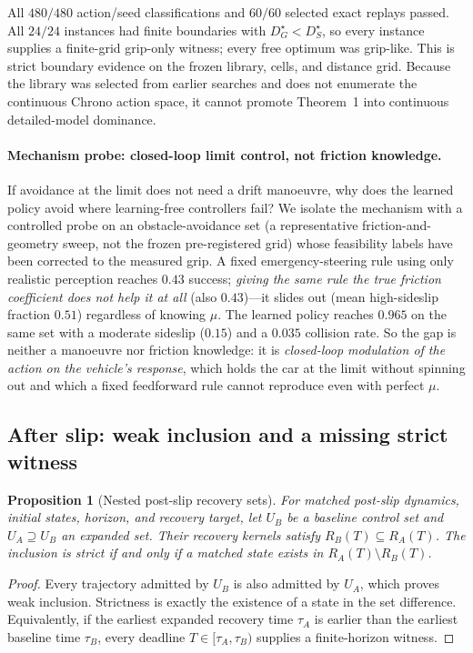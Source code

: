 \documentclass[11pt]{article}
\newtheorem{proposition}{Proposition}
\begin{document}
All $480/480$ action/seed classifications and $60/60$ selected exact replays passed. All $24/24$
instances had finite boundaries with $D_G^\star<D_S^\star$, so every instance supplies a finite-grid
grip-only witness; every free optimum was grip-like. This is strict boundary evidence on the frozen
library, cells, and distance grid. Because the library was selected from earlier searches and does
not enumerate the continuous Chrono action space, it cannot promote Theorem~1 into continuous
detailed-model dominance.

\paragraph{Mechanism probe: closed-loop limit control, not friction knowledge.}
If avoidance at the limit does not need a drift manoeuvre, why does the learned policy avoid where
learning-free controllers fail? We isolate the mechanism with a controlled probe on an
obstacle-avoidance set (a representative friction-and-geometry sweep, not the frozen pre-registered
grid) whose feasibility labels have been corrected to the measured grip. A fixed
emergency-steering rule using only realistic perception reaches $0.43$ success; \emph{giving the same
rule the true friction coefficient does not help it at all} (also $0.43$)---it slides out (mean
high-sideslip fraction $0.51$) regardless of knowing $\mu$. The learned policy reaches $0.965$ on the
same set with a moderate sideslip ($0.15$) and a $0.035$ collision rate. So the gap is neither a
manoeuvre nor friction knowledge: it is \emph{closed-loop modulation of the action on the vehicle's
response}, which holds the car at the limit without spinning out and which a fixed feedforward rule
cannot reproduce even with perfect $\mu$.

\subsection{After slip: weak inclusion and a missing strict witness}

\begin{proposition}[Nested post-slip recovery sets]
For matched post-slip dynamics, initial states, horizon, and recovery target, let $U_B$ be a baseline
control set and $U_A\supseteq U_B$ an expanded set. Their recovery kernels satisfy
$R_B(T)\subseteq R_A(T)$. The inclusion is strict if and only if a matched state exists in
$R_A(T)\setminus R_B(T)$.
\end{proposition}
\begin{proof}
Every trajectory admitted by $U_B$ is also admitted by $U_A$, which proves weak inclusion. Strictness
is exactly the existence of a state in the set difference. Equivalently, if the earliest expanded
recovery time $\tau_A$ is earlier than the earliest baseline time $\tau_B$, every deadline
$T\in[\tau_A,\tau_B)$ supplies a finite-horizon witness.
\end{proof}
\end{document}
